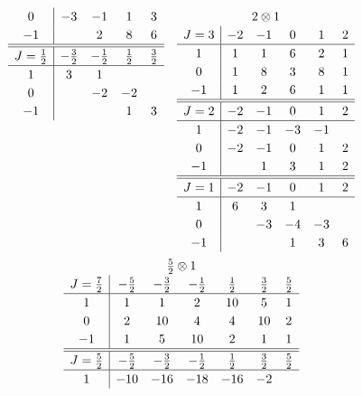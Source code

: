\documentclass[amsmath,amssymb,prc,aps]{revtex4-2}
\begin{document}
\begin{gather}
\begin{array}[t]{c|cccc}
   0         & -3        & -1        &  1       &  3       \\
  -1         &           &  2        &  8       &  6
  \\\hline\hline
  J=\tfrac12 & -\tfrac32 & -\tfrac12 & \tfrac12 & \tfrac32 \\ \hline
   1         &  3        &  1        &          &          \\
   0         &           & -2        &  -2      &          \\
  -1         &           &           &   1      &  3
  \end{array}
  \quad
  \begin{array}[t]{c|ccccc}
  \multicolumn{6}{c}{2\otimes1} \\
  J=3 & -2 & -1 &  0 &  1 & 2 \\ \hline
   1  &  1 &  1 &  6 &  2 & 1 \\
   0  &  1 &  8 &  3 &  8 & 1 \\
  -1  &  1 &  2 &  6 &  1 & 1
  \\\hline\hline
  J=2 & -2 & -1 &  0 &  1 & 2 \\ \hline
   1  & -2 & -1 & -3 & -1 &   \\
   0  & -2 & -1 &  0 &  1 & 2 \\
  -1  &    &  1 &  3 &  1 & 2
  \\\hline\hline
  J=1 & -2 & -1 &  0 & 1  & 2 \\ \hline
   1  &  6 &  3 &  1 &    &   \\
   0  &    & -3 & -4 & -3 &   \\
  -1  &    &    &  1 &  3 & 6
  \end{array} \\
  \renewcommand{\arraystretch}{1.2}
  \begin{array}[t]{c|ccccccc}
  \multicolumn{7}{c}{\tfrac52\otimes1} \\
  J=\tfrac72 & -\tfrac52 & -\tfrac32 & -\tfrac12 & \tfrac12 & \tfrac32 & \tfrac52 \\ \hline
   1         &  1        &   1       &  2        & 10       &  5       &  1       \\
   0         &  2        &  10       &  4        &  4       &  10      &  2       \\
  -1         &  1        &   5       & 10        &  2       &  1       &  1
  \\\hline\hline
  J=\tfrac52 & -\tfrac52 & -\tfrac32 & -\tfrac12 & \tfrac12 & \tfrac32 & \tfrac52 \\ \hline
   1         & -10       & -16       & -18       & -16      & -2       &          \\

\end{array}
\end{gather}
\end{document}
